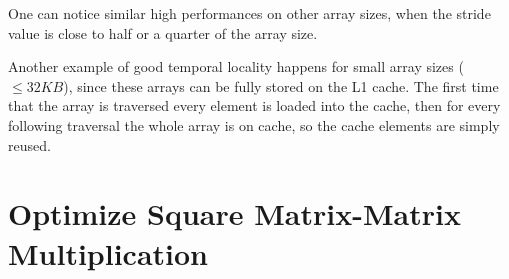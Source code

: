 \documentclass[unicode,11pt,a4paper,oneside,numbers=endperiod,openany]{scrartcl}
\begin{document}
\begin{enumerate}
            One can notice similar high performances on other array sizes, when the stride value is close to half or a quarter of the array size.

            Another example of good temporal locality happens for small array sizes ($\leq 32KB$), since these arrays can be fully stored on the L1 cache.
            The first time that the array is traversed every element is loaded into the cache, then for every following traversal the whole array is on cache, so the cache elements are simply reused.

    \end{enumerate}

    \section{Optimize Square Matrix-Matrix Multiplication  }
\end{document}
